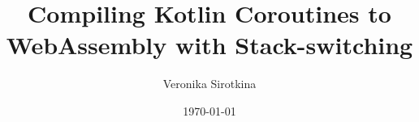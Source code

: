 \documentclass[12pt,a4paper,twoside,openany]{book}
\title{Compiling Kotlin Coroutines to WebAssembly with Stack-switching}
\author{Veronika Sirotkina}
\date{\today}
\theoremstyle{definition}
\theoremstyle{remark}
\begin{document}
\frontmatter




\tableofcontents
\listoffigures
\listoftables
\lstlistoflistings

\mainmatter







\backmatter



\appendix

\end{document}
